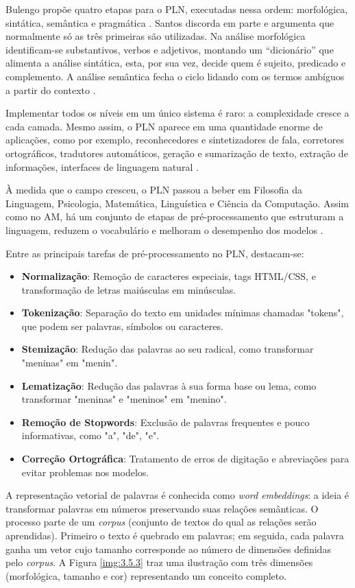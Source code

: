 Bulengo propõe quatro etapas para o PLN, executadas nessa ordem: morfológica, sintática, semântica e pragmática \cite{bulegon2010}. Santos discorda em parte e argumenta que normalmente só as três primeiras são utilizadas. Na análise morfológica identificam-se substantivos, verbos e adjetivos, montando um ``dicionário'' que alimenta a análise sintática, esta, por sua vez, decide quem é sujeito, predicado e complemento. A análise semântica fecha o ciclo lidando com os termos ambíguos a partir do contexto \cite{santos2015}.

Implementar todos os níveis em um único sistema é raro: a complexidade cresce a cada camada. Mesmo assim, o PLN aparece em uma quantidade enorme de aplicações, como por exemplo, reconhecedores e sintetizadores de fala, corretores ortográficos, tradutores automáticos, geração e sumarização de texto, extração de informações, interfaces de linguagem natural \cite{vieira2001}.

À medida que o campo cresceu, o PLN passou a beber em Filosofia da Linguagem, Psicologia, Matemática, Linguística e Ciência da Computação. Assim como no AM, há um conjunto de etapas de pré-processamento que estruturam a linguagem, reduzem o vocabulário e melhoram o desempenho dos modelos \cite{rezende2011}.

Entre as principais tarefas de pré-processamento no PLN, destacam-se:

\begin{itemize}
    \item \textbf{Normalização}: Remoção de caracteres especiais, tags HTML/CSS, e transformação de letras maiúsculas em minúsculas.
    \item \textbf{Tokenização}: Separação do texto em unidades mínimas chamadas "tokens", que podem ser palavras, símbolos ou caracteres.
    \item \textbf{Stemização}: Redução das palavras ao seu radical, como transformar "meninas" em "menin".
    \item \textbf{Lematização}: Redução das palavras à sua forma base ou lema, como transformar "meninas" e "meninos" em "menino".
    \item \textbf{Remoção de Stopwords}: Exclusão de palavras frequentes e pouco informativas, como "a", "de", "e".
    \item \textbf{Correção Ortográfica}: Tratamento de erros de digitação e abreviações para evitar problemas nos modelos.
\end{itemize}

A representação vetorial de palavras é conhecida como \textit{word embeddings}: a ideia é transformar palavras em números preservando suas relações semânticas. O processo parte de um \textit{corpus} (conjunto de textos do qual as relações serão aprendidas). Primeiro o texto é quebrado em palavras; em seguida, cada palavra ganha um vetor cujo tamanho corresponde ao número de dimensões definidas pelo \textit{corpus}. A Figura \ref{img:3.5.3} traz uma ilustração com três dimensões (morfológica, tamanho e cor) representando um conceito completo.

